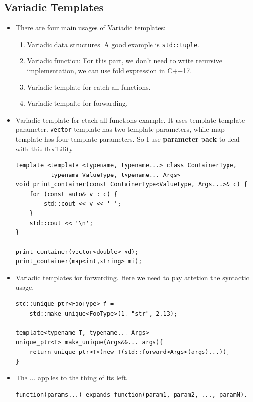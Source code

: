 \documentclass[a4paper,11pt,twoside]{book}
\begin{document}
\subsection{Variadic Templates}
\begin{itemize}
    \item There are four main usages of Variadic templates:
        \begin{enumerate}
            \item Variadic data structures: A good example is \texttt{std::tuple}.
            \item Variadic function: For this part, we don't need to write recursive implementation, we can use fold expression in C++17.
            \item Variadic template for catch-all functions. 
            \item Variadic tempalte for forwarding.
        \end{enumerate}

    \item Variadic template for ctach-all functions example. It uses template template parameter. \texttt{vector} template has two template parameters, while map template has four template parameters. So I use \textbf{parameter pack} to deal with this flexibility.

\begin{lstlisting}
template <template <typename, typename...> class ContainerType,
          typename ValueType, typename... Args>
void print_container(const ContainerType<ValueType, Args...>& c) {
    for (const auto& v : c) {
        std::cout << v << ' ';
    }
    std::cout << '\n';
}

print_container(vector<double> vd);
print_container(map<int,string> mi);
\end{lstlisting}

    \item Variadic templates for forwarding. Here we need to pay attetion the syntactic usage. 
\begin{lstlisting}
std::unique_ptr<FooType> f = 
	std::make_unique<FooType>(1, "str", 2.13);

template<typename T, typename... Args>
unique_ptr<T> make_unique(Args&&... args){
	return unique_ptr<T>(new T(std::forward<Args>(args)...));
}
\end{lstlisting}
    \item The ... applies to the thing of its left.
\begin{lstlisting}
function(params...) expands function(param1, param2, ..., paramN).


\end{lstlisting}
\end{itemize}
\end{document}
